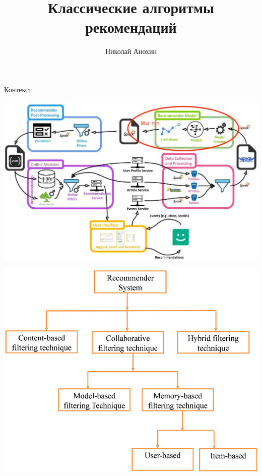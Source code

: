 \documentclass[11pt,aspectratio=169]{beamer}
\author{Николай Анохин}
\title{Классические алгоритмы рекомендаций}
\begin{document}
{

\begin{frame}
\titlepage
\end{frame}


}

\begin{frame}{Контекст}

\begin{center}
\includegraphics[scale=0.23]{images/mendeley.jpeg}
\end{center}

\end{frame}

\begin{frame}
\begin{center}
\includegraphics[scale=0.22]{images/taxonomy.png}
\end{center}
\end{frame}
\end{document}
